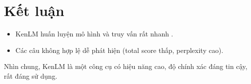 \documentclass[12pt]{article}
\begin{document}
\section{Kết luận}
\begin{itemize}
\item KenLM huấn luyện mô hình và truy vấn rất nhanh .
\item Các câu không hợp lệ dễ phát hiện (total score thấp, perplexity cao).
\end{itemize}
\noindent Nhìn chung, KenLM là một công cụ có hiệu năng cao, độ chính xác đáng tin cậy, rất đáng sử dụng.

\cleardoublepage
{}
{}


\end{document}
